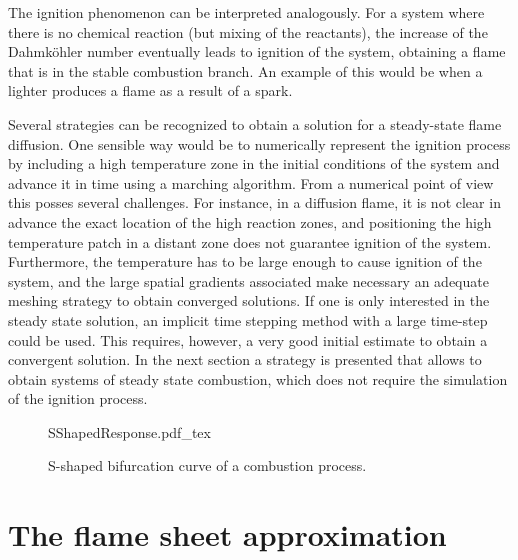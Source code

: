 The ignition phenomenon can be interpreted analogously. For a system where there is no chemical reaction (but mixing of the reactants), the increase of the Dahmköhler number eventually leads to ignition of the system, obtaining a flame that is in the stable combustion branch. An example of this would be when a lighter produces a flame as a result of a spark. 

Several strategies can be recognized to obtain a solution for a steady-state flame diffusion. One sensible way would be to numerically represent the ignition process by including a high temperature zone in the initial conditions of the system and advance it in time using a marching algorithm.  From a numerical point of view this posses several challenges. For instance, in a diffusion flame, it is not clear in advance the exact location of the high reaction zones, and positioning the high temperature patch in a distant zone does not guarantee ignition of the system. Furthermore, the temperature has to be large enough to cause ignition of the system, and the large spatial gradients associated make necessary an adequate meshing strategy to obtain converged solutions. If one is only interested in the steady state solution, an implicit time stepping method with a large time-step could be used. This requires, however, a very good initial estimate to obtain a convergent solution. In the next section a strategy is presented that allows to obtain systems of steady state combustion, which does not require the simulation of the ignition process.
 
\begin{figure}[h]
	\begin{center}
		\def\svgwidth{0.5\textwidth}
		{SShapedResponse.pdf_tex}
		\caption{S-shaped bifurcation curve of a combustion process.}
		\label{fig:Sshaped}%
	\end{center}%
\end{figure}%



\section{The flame sheet approximation} \label{sec:FlameSheet}


